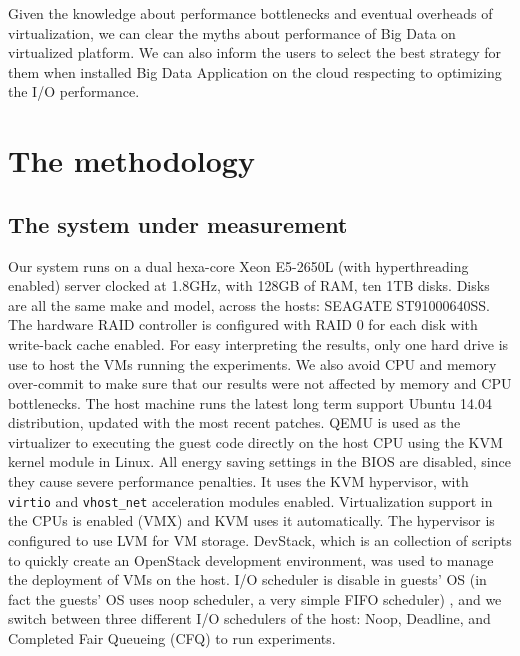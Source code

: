 \documentclass{acmsig}
\begin{document}
Given the knowledge about performance bottlenecks and eventual overheads of virtualization, we can clear the myths about performance of Big Data on virtualized platform. We can also inform the users to select the best strategy for them when installed Big Data Application on the cloud respecting to optimizing the I/O performance.



\section{The methodology}

\subsection{The system under measurement}

Our system runs on a dual hexa-core Xeon E5-2650L (with hyperthreading enabled) server clocked at 1.8GHz, with 128GB of RAM, ten 1TB disks. Disks are all the same make and model, across the hosts: SEAGATE ST91000640SS. The hardware RAID controller is configured with RAID 0 for each disk with write-back cache enabled. For easy interpreting the results, only one hard drive is use to host the VMs running the experiments. We also avoid  CPU and memory over-commit to make sure that our results were not affected by memory and CPU bottlenecks. The host machine runs the latest long term support Ubuntu 14.04 distribution, updated with the most recent patches. QEMU is used as the virtualizer to executing the guest code directly on the host CPU using the KVM kernel module in Linux. All energy saving settings in the BIOS are disabled, since they cause severe performance penalties. It uses the KVM hypervisor, with \texttt{virtio} and \texttt{vhost\_net} acceleration modules enabled. Virtualization support in the CPUs is enabled (VMX) and KVM uses it automatically. The hypervisor is configured to use LVM for VM storage. DevStack, which is an collection of scripts to quickly create an OpenStack development environment, was used to manage the deployment of VMs on the host. I/O scheduler is disable in guests' OS (in fact the guests' OS uses noop scheduler, a very simple FIFO scheduler) , and we switch between three different I/O schedulers of the host: Noop, Deadline, and Completed Fair Queueing (CFQ) to run experiments.
\end{document}

